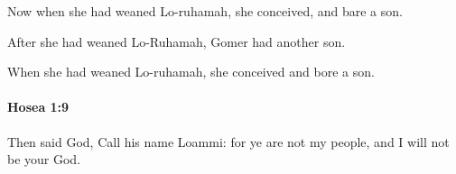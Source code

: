 			\begin{versebox}
					\item[BHS] 
					\item[LXX] 
					\item[ASV] Now when she had weaned Lo-ruhamah, she conceived, and bare a son.
					\item[NIV] After she had weaned Lo-Ruhamah, Gomer had another son.
					\item[NRSV] When she had weaned Lo-ruhamah, she conceived and bore a son.
			\end{versebox}

		\paragraph{Hosea 1:9} %
			\label{HOSEA-1-9}

			Then said God, Call his name Loammi: for ye are not my people, and I will not be your God.

